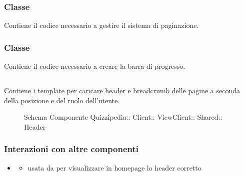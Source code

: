 \subsubsection{Classe }
Contiene il codice necessario a gestire il sistema di paginazione.
\subsubsection{Classe }
Contiene il codice necessario a creare la barra di progresso.
\subsection{}
Contiene i template per caricare header e breadcrumb delle pagine a seconda della posizione e del ruolo dell'utente.
\begin{figure}[H]
\centering
\noindent{}
\caption[Schema Componente Header]{Schema Componente Quizzipedia:: Client:: ViewClient:: Shared:: Header}
\end{figure}
\subsubsection{Interazioni con altre componenti}
\begin{itemize}
\item {}
\begin{itemize}
\item usata da  per visualizzare in homepage lo header corretto
\end{itemize}
\end{itemize}
